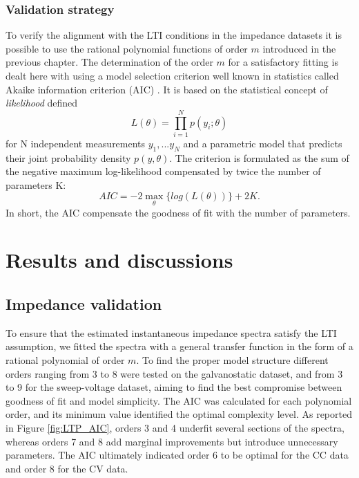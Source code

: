 \subsubsection{Validation strategy}
To verify the alignment with the LTI conditions in the impedance datasets it is possible to use the rational polynomial functions of order $m$ introduced in the previous chapter.
The determination of the order $m$ for a satisfactory fitting is dealt here with using a model selection criterion well known in statistics called Akaike information criterion (AIC) \cite{ingdalAkaikeInformationCriterion2019}.
It is based on the statistical concept of \emph{likelihood} defined 
\begin{equation}
L(\theta)=\prod _{i=1} ^N p(y_i;\theta)
\end{equation}
for N independent measurements {$y_1,...y_N$} and a parametric model that predicts their joint probability density $p(y,\theta)$.
The criterion is formulated as the sum of the negative maximum log-likelihood compensated by twice the number of parameters K:
\begin{equation}
AIC = -2\max_{\theta}\{log(L(\theta))\}+ 2K.
\end{equation}
In short, the AIC compensate the goodness of fit with the number of parameters. 

\section{Results and discussions}

\subsection{Impedance validation}
To ensure that the estimated instantaneous impedance spectra satisfy the LTI assumption, we fitted the spectra with a general transfer function in the form of a rational polynomial of order $m$. To find the proper model structure different orders ranging from 3 to 8 were tested on the galvanostatic dataset, and from 3 to 9 for the sweep-voltage dataset, aiming to find the best compromise between goodness of fit and model simplicity.
The AIC was calculated for each polynomial order, and its minimum value identified the optimal complexity level. As reported in Figure \ref{fig:LTP_AIC}, orders 3 and 4 underfit several sections of the spectra, whereas orders 7 and 8 add marginal improvements but introduce unnecessary parameters. The AIC ultimately indicated order 6 to be optimal for the CC data and order 8 for the CV data.

